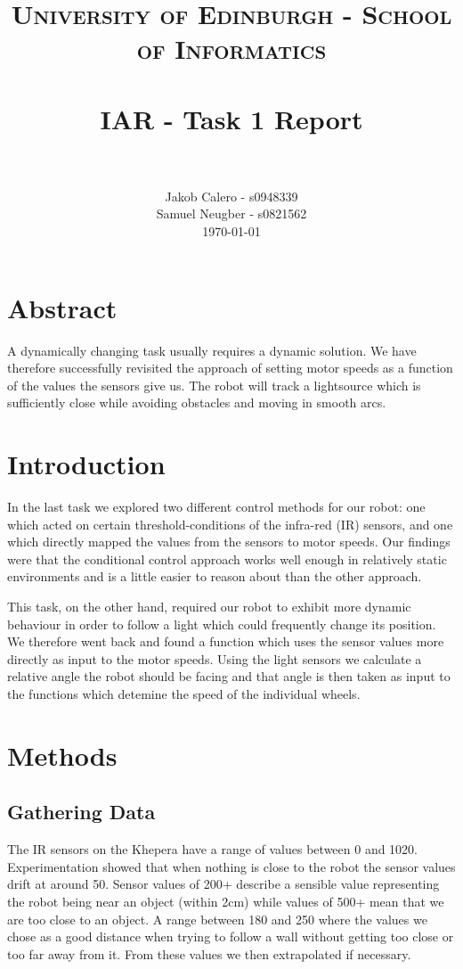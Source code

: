 \documentclass[paper=a4, fontsize=12pt]{scrartcl}	%
\title{
\vspace{-1in} 	
\usefont{OT1}{bch}{b}{n}
\normalfont \normalsize \textsc{University of Edinburgh - School of Informatics}
\\ [25pt]
\horrule{0.5pt} \\[0.4cm]
\large IAR - Task 1 Report \\
\horrule{1pt} \\[0.5cm]
}
\author{
  \normalfont \normalsize
  Jakob Calero - s0948339\\[-3pt]\normalsize
  Samuel Neugber - s0821562\\[-3pt]\normalsize
  \today
}
\date{}
\numberwithin{equation}{section}		%
\numberwithin{figure}{section}			%
\numberwithin{table}{section}				%
\begin{document}
\maketitle					%
\section{Abstract}
A dynamically changing task usually requires a dynamic solution. We have therefore successfully revisited the approach of setting motor speeds as a function of the values the sensors give us. The robot will track a lightsource which is sufficiently close while avoiding obstacles and moving in smooth arcs.


\section{Introduction}
In the last task we explored two different control methods for our robot: one which acted on certain threshold-conditions of the infra-red (IR) sensors, and one which directly mapped the values from the sensors to motor speeds. Our findings were that the conditional control approach works well enough in relatively static environments and is a little easier to reason about than the other approach.

This task, on the other hand, required our robot to exhibit more dynamic behaviour in order to follow a light which could frequently change its position. We therefore went back and found a function which uses the sensor values more directly as input to the motor speeds. Using the light sensors we calculate a relative angle the robot should be facing and that angle is then taken as input to the functions which detemine the speed of the individual wheels.

\section{Methods}
\subsection{Gathering Data}
The IR sensors on the Khepera have a range of values between 0 and 1020.
Experimentation showed that when nothing is close to the robot the sensor values
drift at around 50. Sensor values of 200+ describe a sensible value representing
the robot being near an object (within 2cm) while values of 500+ mean that we
are too close to an object. A range between 180 and 250 where the values we
chose as a good distance when trying to follow a wall without getting too close
or too far away from it. From these values we then extrapolated if necessary.
\end{document}
